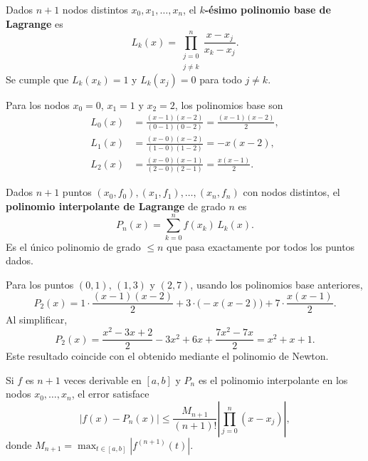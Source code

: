 \documentclass[a4,11pt]{aleph-notas}
\begin{document}
\begin{defi}
    Dados $n+1$ nodos distintos $x_0,x_1,\ldots,x_n$, el \textbf{$k$-ésimo polinomio base de Lagrange} es
    \[
        L_k(x)
        =
        \prod_{\substack{j=0\\j\neq k}}^{n}\frac{x-x_j}{x_k-x_j}.
    \]
    Se cumple que $L_k(x_k)=1$ y $L_k(x_j)=0$ para todo $j\neq k$.
\end{defi}

\begin{ejem}
    Para los nodos $x_0=0$, $x_1=1$ y $x_2=2$, los polinomios base son
    \begin{align*}
        L_0(x)&=\frac{(x-1)(x-2)}{(0-1)(0-2)}=\frac{(x-1)(x-2)}{2},\\[2mm]
        L_1(x)&=\frac{(x-0)(x-2)}{(1-0)(1-2)}=-x(x-2),\\[2mm]
        L_2(x)&=\frac{(x-0)(x-1)}{(2-0)(2-1)}=\frac{x(x-1)}{2}.
    \end{align*}
\end{ejem}

\begin{defi}
    Dados $n+1$ puntos $(x_0,f_0),(x_1,f_1),\ldots,(x_n,f_n)$ con nodos distintos, el \textbf{polinomio interpolante de Lagrange} de grado $n$ es
    \[
        P_n(x)=\sum_{k=0}^{n}f(x_k)\,L_k(x).
    \]
    Es el único polinomio de grado $\leq n$ que pasa exactamente por todos los puntos dados.
\end{defi}

\begin{ejem}
    Para los puntos $(0,1)$, $(1,3)$ y $(2,7)$, usando los polinomios base anteriores,
    \[
        P_2(x)
        =
        1\cdot\frac{(x-1)(x-2)}{2}
        +
        3\cdot\bigl(-x(x-2)\bigr)
        +
        7\cdot\frac{x(x-1)}{2}.
    \]
    Al simplificar,
    \[
        P_2(x)
        =
        \frac{x^2-3x+2}{2}-3x^2+6x+\frac{7x^2-7x}{2}
        =
        x^2+x+1.
    \]
    Este resultado coincide con el obtenido mediante el polinomio de Newton.
\end{ejem}

\begin{defi}
    Si $f$ es $n+1$ veces derivable en $[a,b]$ y $P_n$ es el polinomio interpolante en los nodos $x_0,\ldots,x_n$, el error satisface
    \[
        |f(x)-P_n(x)|
        \leq
        \frac{M_{n+1}}{(n+1)!}
        \left|\prod_{j=0}^{n}(x-x_j)\right|,
    \]
    donde $M_{n+1}=\max_{t\in[a,b]}\left|f^{(n+1)}(t)\right|$.
\end{defi}
\end{document}
